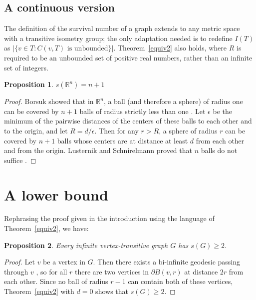 \documentclass[11pt]{article}
\newtheorem{prop}{Proposition}
\newcommand{\R}{\mathbb{R}}
\begin{document}

\subsection{A continuous version}

The definition of the survival number of a graph extends to any metric space with a transitive isometry group; the only adaptation needed is to redefine $I(T)$ as $\bigl|\{v \in T : C(v,T)\mbox{ is unbounded}\}\bigr|.$ Theorem~\ref{equiv2} also holds, where $R$ is required to be an unbounded set of positive real numbers, rather than an infinite set of integers.

\begin{prop}\label{Rn} $s(\R^n)=n+1$ \end{prop}

\begin{proof} Borsuk showed that in $\R^n$, a ball (and therefore a sphere) of radius one can be covered by $n+1$ balls of radius strictly less than one \cite{Borsuk}. Let $\epsilon$ be the minimum of the pairwise distances of the centers of these balls to each other and to the origin, and let $R = d/\epsilon$. Then for any $r > R$, a sphere of radius $r$ can be covered by $n+1$ balls whose centers are at distance at least $d$ from each other and from the origin. Lusternik and Schnirelmann proved that $n$ balls do not suffice \cite{LusSch}.
\end{proof}



\section{A lower bound}
\label{sec:lowerbound}

Rephrasing the proof given in the introduction using the language of Theorem~\ref{equiv2}, we have:

\begin{prop}\label{lowerbound}Every infinite vertex-transitive graph $G$ has $s(G) \geq 2$. \end{prop}

\begin{proof} Let $v$ be a vertex in $G$. Then there exists a bi-infinite geodesic passing through $v$ \cite{3caret}, so for all $r$ there are two vertices in $\partial B(v,r)$ at distance $2r$ from each other. Since no ball of radius $r-1$ can contain both of these vertices, Theorem~\ref{equiv2} with $d = 0$ shows that $s(G) \geq 2$. \end{proof}
\end{document}

